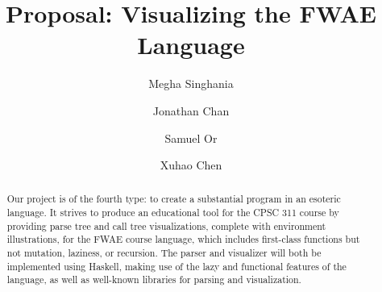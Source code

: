 \documentclass[format=acmsmall, review=false, nonacm=false, screen=true]{acmart}
\begin{document}
\title{Proposal: Visualizing the FWAE Language}

\author{Megha Singhania}
\author{Jonathan Chan}
\author{Samuel Or}

\author{Xuhao Chen}

\begin{abstract}
\vspace{0.65em}

Our project is of the fourth type: to create a substantial program in an esoteric language. It strives to produce an educational tool for the CPSC 311 course by providing parse tree and call tree visualizations, complete with environment illustrations, for the FWAE course language, which includes first-class functions but not mutation, laziness, or recursion. The parser and visualizer will both be implemented using Haskell, making use of the lazy and functional features of the language, as well as well-known libraries for parsing and visualization.
\end{abstract}

\maketitle


\end{document}
